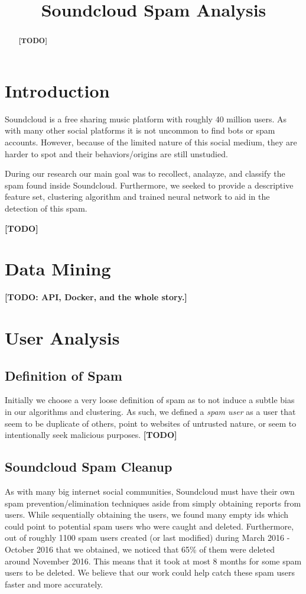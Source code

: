 \documentclass[11pt,twocolumn]{article} %
\title{Soundcloud Spam Analysis}
\author{}
\begin{document}
\maketitle

\begin{abstract}
\textbf{[TODO]}
\end{abstract}

\section{Introduction}
Soundcloud is a free sharing music platform with roughly 40 million users. As with many other social platforms it is not uncommon to find bots or spam accounts. However, because of the limited nature of this social medium, they are harder to spot and their behaviors/origins are still unstudied. 
\par During our research our main goal was to recollect, analayze, and classify the spam found inside Soundcloud. Furthermore, we seeked to provide a descriptive feature set, clustering algorithm and trained neural network to aid in the detection of this spam. 
\par \textbf{[TODO]}

\section{Data Mining}
\textbf{[TODO: API, Docker, and the whole story.]}

\section{User Analysis}

\subsection{Definition of Spam}
Initially we choose a very loose definition of spam as to not induce a subtle bias in our algorithms and clustering. As such, we defined a \textit{spam user} as a user that seem to be duplicate of others, point to websites of untrusted nature, or seem to intentionally seek malicious purposes. 
\textbf{[TODO]}

\subsection{Soundcloud Spam Cleanup}
As with many big internet social communities, Soundcloud must have their own spam prevention/elimination techniques aside from simply obtaining reports from users. While sequentially obtaining the users, we found many empty ids which could point to potential spam users who were caught and deleted. Furthermore, out of roughly 1100 spam users created (or last modified) during March 2016 - October 2016 that we obtained, we noticed that 65\% of them were deleted around November 2016. This means that it took at most 8 months for some spam users to be deleted. We believe that our work could help catch these spam users faster and more accurately.
\end{document}
